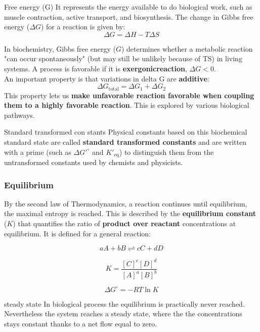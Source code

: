 \documentclass[../main.tex]{subfiles}
\begin{document}
\begin{DefWithTitle}{Free energy (G)}
	It represents the energy available to do biological work, such as muscle contraction, active transport, and biosynthesis. The change in Gibbs free energy (\(\Delta G\)) for a reaction is given by:
	\[
	\Delta G = \Delta H - T \Delta S
	\]
\end{DefWithTitle} 
In biochemistry, Gibbs free energy (\(G\)) determines whether a metabolic reaction "can occur spontaneously" (but may still be unlikely because of TS) in living systems. A process is favorable if it is \textbf{\gls{exergonicreaction}}, \(\Delta G < 0\).\\
An important property is that variations in delta G are \textbf{additive}:
\[
\Delta G_{\text{total}} = \Delta G_1 + \Delta G_2
\]
This property lets us \textbf{make unfavorable reaction favorable when coupling them to a highly favorable reaction}. This is explored by various biological pathways.

\begin{RemarkWithTitel}{Standard transformed con
		stants}
	Physical constants based on this biochemical standard state are called \textbf{standard transformed constants} and are written with a prime (such as \( \Delta G'^\circ \) and \( K'_{\text{eq}} \)) to distinguish them from the untransformed constants used by chemists and physicists.
\end{RemarkWithTitel}

\subsubsection{Equilibrium}
By the second law of Thermodynamics, a reaction continues until equilibrium, the maximal entropy is reached. This is described by the \textbf{equilibrium constant} (\(K\)) that  quantifies the ratio of \textbf{product over reactant} concentrations at equilibrium. It is defined for a general reaction:

\[
aA + bB \rightleftharpoons cC + dD
\]

\[
K = \frac{[C]^c [D]^d}{[A]^a [B]^b}
\]

\[
\Delta G^\circ = -RT \ln K
\]

\begin{RemarkWithTitel}{steady state}
	In biological process the equilibrium is practically never reached. Nevertheless the system reaches a steady state, where the the concentrations stays constant thanks to a net flow equal to zero. 
\end{RemarkWithTitel}
\end{document}
